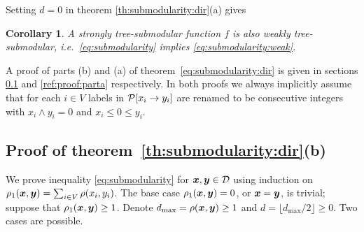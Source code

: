 \documentclass[11pt,onecolumn]{article}
\newtheorem{corollary}[theorem]{Corollary}
\def\D{{\cal D}}
\def\calP{{\cal P}}
\newcommand{\bx}{\mbox{\boldmath $x$}}
\newcommand{\by}{\mbox{\boldmath $y$}}
\begin{document}
Setting $d=0$ in theorem \ref{th:submodularity:dir}(a) gives
\begin{corollary}
A strongly tree-submodular function $f$ is also weakly tree-submodular, i.e.\ \eqref{eq:submodularity} implies \eqref{eq:submodularity:weak}.
\end{corollary}

A proof of parts (b) and (a) of theorem~\ref{eq:submodularity:dir} is given 
in sections \ref{ref:proof:partb} and \ref{ref:proof:parta} respectively.
In both proofs we always implicitly assume
that for each $i\in V$ labels in $\calP[x_i\rightarrow y_i]$ are renamed to be consecutive integers with $x_i\wedge y_i=0$ and $x_i\le 0\le y_i$.

\subsection{Proof of theorem~\ref{th:submodularity:dir}(b)}\label{ref:proof:partb}
We prove inequality \eqref{eq:submodularity} for $\bx,\by\in\D$ using induction on $\rho_1(\bx,\by)=\sum_{i\in V}\rho(x_i,y_i)$.
The base case $\rho_1(\bx,\by)=0$, or $\bx=\by$, is trivial; suppose that $\rho_1(\bx,\by)\ge 1$.
Denote $d_{\max}=\rho(\bx,\by)\ge 1$ and $d=\lfloor d_{\max}/2 \rfloor\ge 0$. Two cases are possible.
\end{document}
